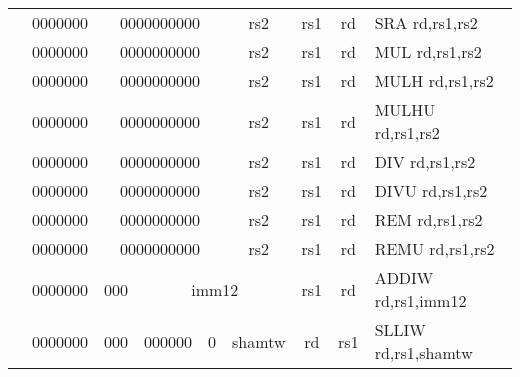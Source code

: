 \begin{table}[p]
\begin{small}
\begin{center}
\begin{tabular}{rcccccccccl}
&
\multicolumn{1}{|c|}{0000000} &
\multicolumn{5}{c|}{0000000000} &
\multicolumn{1}{c|}{rs2} &
\multicolumn{1}{c|}{rs1} &
\multicolumn{1}{c|}{rd} & SRA rd,rs1,rs2 \\
\cline{2-10}
  

&
\multicolumn{1}{|c|}{0000000} &
\multicolumn{5}{c|}{0000000000} &
\multicolumn{1}{c|}{rs2} &
\multicolumn{1}{c|}{rs1} &
\multicolumn{1}{c|}{rd} & MUL rd,rs1,rs2 \\
\cline{2-10}
  

&
\multicolumn{1}{|c|}{0000000} &
\multicolumn{5}{c|}{0000000000} &
\multicolumn{1}{c|}{rs2} &
\multicolumn{1}{c|}{rs1} &
\multicolumn{1}{c|}{rd} & MULH rd,rs1,rs2 \\
\cline{2-10}
  

&
\multicolumn{1}{|c|}{0000000} &
\multicolumn{5}{c|}{0000000000} &
\multicolumn{1}{c|}{rs2} &
\multicolumn{1}{c|}{rs1} &
\multicolumn{1}{c|}{rd} & MULHU rd,rs1,rs2 \\
\cline{2-10}
  

&
\multicolumn{1}{|c|}{0000000} &
\multicolumn{5}{c|}{0000000000} &
\multicolumn{1}{c|}{rs2} &
\multicolumn{1}{c|}{rs1} &
\multicolumn{1}{c|}{rd} & DIV rd,rs1,rs2 \\
\cline{2-10}
  

&
\multicolumn{1}{|c|}{0000000} &
\multicolumn{5}{c|}{0000000000} &
\multicolumn{1}{c|}{rs2} &
\multicolumn{1}{c|}{rs1} &
\multicolumn{1}{c|}{rd} & DIVU rd,rs1,rs2 \\
\cline{2-10}
  

&
\multicolumn{1}{|c|}{0000000} &
\multicolumn{5}{c|}{0000000000} &
\multicolumn{1}{c|}{rs2} &
\multicolumn{1}{c|}{rs1} &
\multicolumn{1}{c|}{rd} & REM rd,rs1,rs2 \\
\cline{2-10}
  

&
\multicolumn{1}{|c|}{0000000} &
\multicolumn{5}{c|}{0000000000} &
\multicolumn{1}{c|}{rs2} &
\multicolumn{1}{c|}{rs1} &
\multicolumn{1}{c|}{rd} & REMU rd,rs1,rs2 \\
\cline{2-10}
  

&
\multicolumn{1}{|c|}{0000000} &
\multicolumn{2}{c|}{000} &
\multicolumn{4}{c|}{imm12} &
\multicolumn{1}{c|}{rs1} &
\multicolumn{1}{c|}{rd} & ADDIW rd,rs1,imm12 \\
\cline{2-10}
  

&
\multicolumn{1}{|c|}{0000000} &
\multicolumn{2}{c|}{000} &
\multicolumn{2}{c|}{000000} &
\multicolumn{1}{c|}{0} &
\multicolumn{1}{c|}{shamtw} &
\multicolumn{1}{c|}{rd} &
\multicolumn{1}{c|}{rs1} & SLLIW rd,rs1,shamtw \\
\cline{2-10}
  


\end{tabular}
\end{center}
\end{small}
\end{table}
